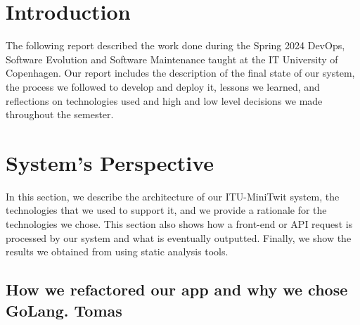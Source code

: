 \documentclass{article}
\begin{document}
\section{Introduction}
The following report described the work done during the Spring 2024 DevOps, Software Evolution and Software Maintenance taught at the IT University of Copenhagen. Our report includes the description of the final state of our system, the process we followed to develop and deploy it, lessons we learned, and reflections on technologies used and high and low level decisions we made throughout the semester.

\section{System's Perspective}
In this section, we describe the architecture of our ITU-MiniTwit system, the technologies that we used to support it, and we provide a rationale for the technologies we chose. This section also shows how a front-end or API request is processed by our system and what is eventually outputted. Finally, we show the results we obtained from using static analysis tools.

\subsection{How we refactored our app and why we chose GoLang. Tomas}
\end{document}
